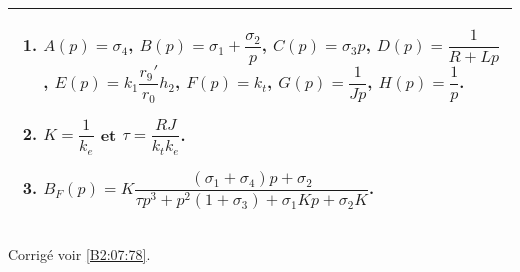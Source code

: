 \ifprof
\else
\begin{center}
\end{center}
\fi


\ifprof
\else
\footnotesize
\begin{tabular}{|p{.95\linewidth}|}
\hline
\begin{enumerate}
\item 
$A(p)=\sigma_4$,
$B(p)=\sigma_1 + \dfrac{\sigma_2}{p}$, 
$C(p)=\sigma_3 p$, 
$D(p) = \dfrac{1}{R+Lp}$, 
$E(p)= k_1 \dfrac{r_9'}{r_0}h_2 $, 
$F(p)=k_t$, 
$G(p)=\dfrac{1}{Jp}$, 
$H(p)=\dfrac{1}{p}$.
\item $K = \dfrac{1}{k_e}$ et $\tau = \dfrac{RJ}{k_t k_e}$.
\item $B_F(p) = K \dfrac{\left(\sigma_1+ \sigma_4 \right) p + \sigma_2 }{ \tau p^3 + p^2\left(1+\sigma_3 \right)  + \sigma_1 K p + \sigma_2 K  }$.
\end{enumerate} \\
\hline
\end{tabular}
\normalsize
\begin{flushright}
\footnotesize{Corrigé  voir \ref{B2:07:78}.}
\end{flushright}%
\fi